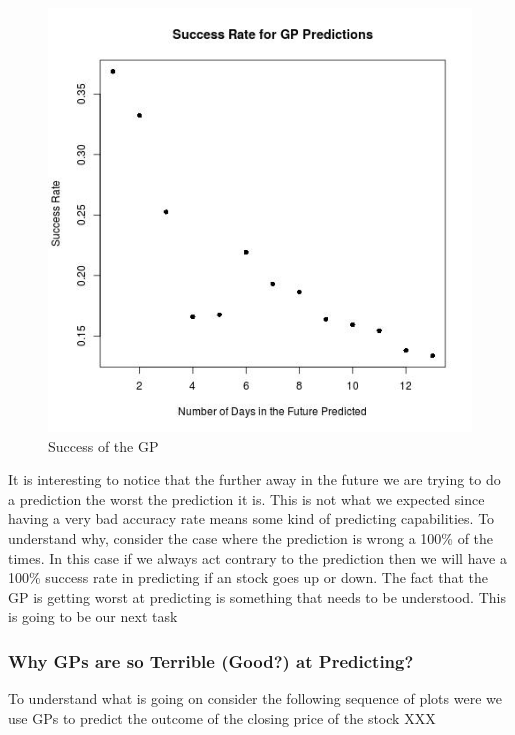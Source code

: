 \documentclass{article}
\begin{document}
\begin{figure}[H]
\centering
\includegraphics[scale=0.4]{../Algorithms/Juan/figures/successPlot}
\caption{Success of the GP}
\end{figure}

It is interesting to notice that the further away in the future we are trying to do a prediction
the worst the prediction it is. This is not what we expected since having a very bad accuracy rate
means some kind of predicting capabilities. To understand why, consider the case where the prediction
is wrong a 100\% of the times. In this case if we always act contrary to the prediction then we will
have a 100\% success rate in predicting if an stock goes up or down. The fact that the GP is getting
worst at predicting is something that needs to be understood. This is going to be our next task

\subsubsection{Why GPs are so Terrible (Good?) at Predicting?}
To understand what is going on consider the following sequence of plots
were we use GPs to predict the outcome of the closing price of the stock XXX
\end{document}
